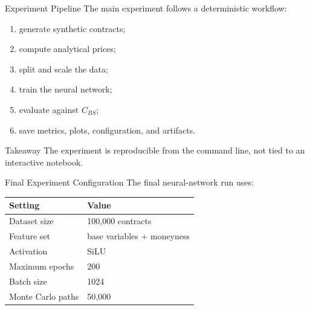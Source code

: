 \documentclass[10pt,aspectratio=43]{beamer}
\newcommand{\takeaway}[1]{%
    \begin{block}{Takeaway}
        #1
    \end{block}
}
\begin{document}
\begin{frame}{Experiment Pipeline}
    The main experiment follows a deterministic workflow:

    \begin{enumerate}
        \item generate synthetic contracts;
        \item compute analytical prices;
        \item split and scale the data;
        \item train the neural network;
        \item evaluate against \(C_{BS}\);
        \item save metrics, plots, configuration, and artifacts.
    \end{enumerate}

    \takeaway{The experiment is reproducible from the command line, not tied to an interactive notebook.}
\end{frame}

\begin{frame}{Final Experiment Configuration}
    The final neural-network run uses:

    \begin{center}
        \small
        \begin{tabular}{ll}
            \toprule
            Setting           & Value                      \\
            \midrule
            Dataset size      & 100,000 contracts          \\
            Feature set       & base variables + moneyness \\
            Activation        & SiLU                       \\
            Maximum epochs    & 200                        \\
            Batch size        & 1024                       \\
            Monte Carlo paths & 50,000                     \\
            \bottomrule
        \end{tabular}
    \end{center}
\end{frame}
\end{document}
